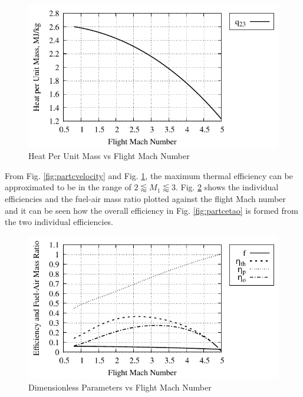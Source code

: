 \documentclass[conf]{new-aiaa} %
\begin{document}
\begin{figure}[H] %
    \centering
    \includegraphics[]{media/performance_parameter_files/part_c_heat.pdf}
    \caption{\label{fig:partcheat}Heat Per Unit Mass vs Flight Mach Number}
\end{figure}

From Fig. \ref{fig:partcvelocity} and Fig. \ref{fig:partcheat}, the maximum thermal efficiency can be approximated to be in the range of $2\lessapprox M_1\lessapprox3$. Fig. \ref{fig:partcdimless} shows the individual efficiencies and the fuel-air mass ratio plotted against the flight Mach number and it can be seen how the overall efficiency in Fig. \ref{fig:partcetao} is formed from the two individual efficiencies.

\begin{figure}[H] %
    \centering
    \includegraphics[]{media/performance_parameter_files/part_c_dimless.pdf}
    \caption{\label{fig:partcdimless}Dimensionless Parameters vs Flight Mach Number}
\end{figure}
\end{document}
